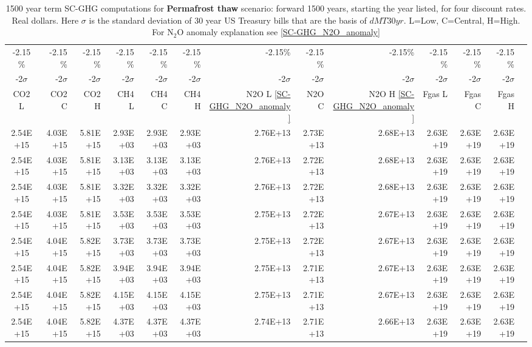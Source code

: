 \documentclass{article}
\begin{document}
\begin{table}
   \caption{1500 year term SC-GHG computations for \textbf{Permafrost thaw}  \cite{Schuur2022PermafrostFeedbacksWarming} scenario: forward 1500 years, starting the year listed, for four discount rates. Real dollars. Here $\sigma$ is the standard deviation of 30 year US Treasury bills that are the basis of $dMT30yr$. L=Low, C=Central, H=High. For N$_2$O anomaly explanation see \ref{SC-GHG_N2O_anomaly}} 
\label{PVs_1500_yearSCC_S1}
\small
\begin{tabular}{crrr|rrr|rrr|rrr}
-2.15\%    & -2.15\%    & -2.15\%    & -2.15\%    & -2.15\%    & -2.15\%    & -2.15\%    & -2.15\%    & -2.15\%    & -2.15\%    & -2.15\%    & -2.15\%    \\
-2$\sigma$ & -2$\sigma$ & -2$\sigma$ & -2$\sigma$ & -2$\sigma$ & -2$\sigma$ & -2$\sigma$ & -2$\sigma$ & -2$\sigma$ & -2$\sigma$ & -2$\sigma$ & -2$\sigma$ \\
CO2 L      & CO2 C      & CO2 H      & CH4 L      & CH4 C      & CH4 H      & N2O L \ref{SC-GHG_N2O_anomaly}     & N2O C      & N2O H \ref{SC-GHG_N2O_anomaly}      & Fgas L     & Fgas C     & Fgas H     \\
2.54E+15   & 4.03E+15   & 5.81E+15   & 2.93E+03   & 2.93E+03   & 2.93E+03   & 2.76E+13   & 2.73E+13   & 2.68E+13   & 2.63E+19   & 2.63E+19   & 2.63E+19   \\
2.54E+15   & 4.03E+15   & 5.81E+15   & 3.13E+03   & 3.13E+03   & 3.13E+03   & 2.76E+13   & 2.72E+13   & 2.68E+13   & 2.63E+19   & 2.63E+19   & 2.63E+19   \\
2.54E+15   & 4.03E+15   & 5.81E+15   & 3.32E+03   & 3.32E+03   & 3.32E+03   & 2.76E+13   & 2.72E+13   & 2.68E+13   & 2.63E+19   & 2.63E+19   & 2.63E+19   \\
2.54E+15   & 4.03E+15   & 5.81E+15   & 3.53E+03   & 3.53E+03   & 3.53E+03   & 2.75E+13   & 2.72E+13   & 2.67E+13   & 2.63E+19   & 2.63E+19   & 2.63E+19   \\
2.54E+15   & 4.04E+15   & 5.82E+15   & 3.73E+03   & 3.73E+03   & 3.73E+03   & 2.75E+13   & 2.72E+13   & 2.67E+13   & 2.63E+19   & 2.63E+19   & 2.63E+19   \\
2.54E+15   & 4.04E+15   & 5.82E+15   & 3.94E+03   & 3.94E+03   & 3.94E+03   & 2.75E+13   & 2.71E+13   & 2.67E+13   & 2.63E+19   & 2.63E+19   & 2.63E+19   \\
2.54E+15   & 4.04E+15   & 5.82E+15   & 4.15E+03   & 4.15E+03   & 4.15E+03   & 2.75E+13   & 2.71E+13   & 2.67E+13   & 2.63E+19   & 2.63E+19   & 2.63E+19   \\
2.54E+15   & 4.04E+15   & 5.82E+15   & 4.37E+03   & 4.37E+03   & 4.37E+03   & 2.74E+13   & 2.71E+13   & 2.66E+13   & 2.63E+19   & 2.63E+19   & 2.63E+19   \\

\end{tabular}
\end{table}
\end{document}
